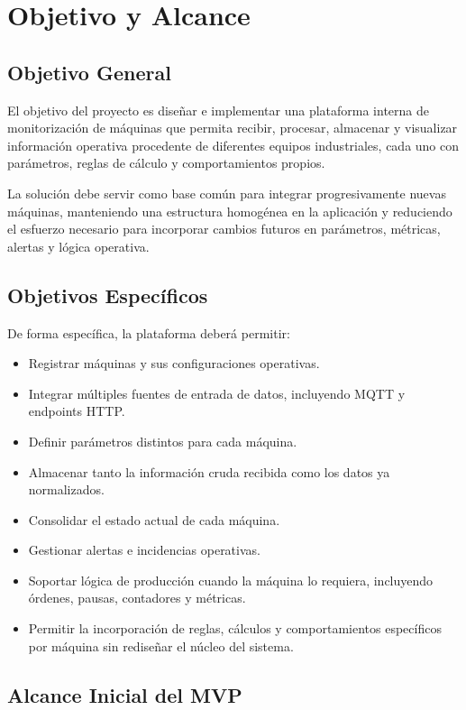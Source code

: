 \section{Objetivo y Alcance}

\subsection{Objetivo General}

El objetivo del proyecto es diseñar e implementar una plataforma interna de monitorización de máquinas que permita recibir, procesar, almacenar y visualizar información operativa procedente de diferentes equipos industriales, cada uno con parámetros, reglas de cálculo y comportamientos propios.

La solución debe servir como base común para integrar progresivamente nuevas máquinas, manteniendo una estructura homogénea en la aplicación y reduciendo el esfuerzo necesario para incorporar cambios futuros en parámetros, métricas, alertas y lógica operativa.

\subsection{Objetivos Específicos}

De forma específica, la plataforma deberá permitir:

\begin{itemize}
    \item Registrar máquinas y sus configuraciones operativas.
    \item Integrar múltiples fuentes de entrada de datos, incluyendo MQTT y endpoints HTTP.
    \item Definir parámetros distintos para cada máquina.
    \item Almacenar tanto la información cruda recibida como los datos ya normalizados.
    \item Consolidar el estado actual de cada máquina.
    \item Gestionar alertas e incidencias operativas.
    \item Soportar lógica de producción cuando la máquina lo requiera, incluyendo órdenes, pausas, contadores y métricas.
    \item Permitir la incorporación de reglas, cálculos y comportamientos específicos por máquina sin rediseñar el núcleo del sistema.
\end{itemize}

\subsection{Alcance Inicial del MVP}

